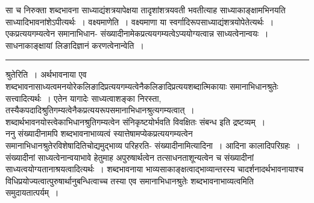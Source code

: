 \documentclass[11pt, openany]{book}
\begin{document}
 सा च निरुक्ता शब्दभावना साध्याद्यंशत्रयापेक्षया तादृशांशत्रयवती भवतीत्याह साध्याकाङ्क्षामभिनयति साध्यादिभावनांशेऽपीत्यर्थः~। {\br वक्ष्यमाणेति~।} वक्ष्यमाणा या स्वर्गादिरूपसाध्याद्यंशत्रयोपेतेत्यर्थः~। {\br एकप्रत्ययगम्यत्वेन समानाभिधान- }
\newpage
{\bl 
संख्यादीनामेकप्रत्ययगम्यत्वेऽप्ययोग्यत्वान्न साध्यत्वेनान्वयः~। साधनाकाङ्क्षायां लिङादिज्ञानं करणत्वेनान्वेति~।}\\
\hrule
\vspace{3mm}
\noindent
{\br श्रुतेरिति~।} अर्थभावनाया एव शब्दभावनासाध्यत्वमनयोरेकलिङादिप्रत्ययगम्यत्वेनैकलिङादिप्रत्ययशब्दात्मिकायाः समानाभिधानश्रुतेः सत्त्वादित्यर्थः~। एतेन यागादेः साध्यत्वाशङ्का निरस्ता, तस्यैकपदादिश्रुतिगम्यत्वेनैकप्रत्ययरूपसमानाभिधानश्रुत्यगम्यत्वात्~। शब्दार्थभावनयोस्त्वेकाभिधानश्रुतिगम्यत्वेन संनिकृष्टयोर्भवति विवक्षितः
संबन्ध इति द्रष्टव्यम्~।~\\

 {\br ननु} संख्यादीनामपि शब्दभावनाभाव्यत्वं स्यात्तेषामप्येकप्रत्ययगम्यत्वेन  समानाभिधानश्रुतेरविशेषादितिचोद्यमुद्भाव्य परिहरति- {\br संख्यादीनामित्यादिना~।} आदिना कालादिपरिग्रहः~। संख्यादीनां साध्यत्वेनान्वयाभावे हेतुमाह अपुरुषार्थत्वेन तत्साधनताशून्यत्वेन च संख्यादीनां साध्यत्वयोग्यतानाश्रयत्वादित्यर्थः~। शब्दभावनाया भाव्यसाकाङ्क्षत्वाद्भाव्यान्तरस्य चादर्शनादर्थभावनायाश्च विधिप्रयोज्यत्वात्पुरुषार्थानुबन्धित्वाच्च तस्या एव समानाभिधानश्रुतेः
शब्दभावनाभाव्यत्वमिति समुदायतात्पर्यम्~।\\
\end{document}
